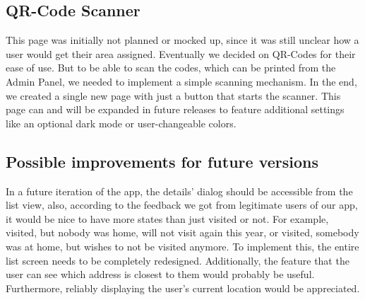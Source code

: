 \subsection{QR-Code Scanner}
This page was initially not planned or mocked up, since it was still unclear how a user would get their area assigned. Eventually we decided on QR-Codes for their ease of use. But to be able to scan the codes, which can be printed from the Admin Panel, we needed to implement a simple scanning mechanism. In the end, we created a single new page with just a button that starts the scanner. This page can and will be expanded in future releases to feature additional settings like an optional dark mode or user-changeable colors. 

\subsection{Possible improvements for future versions}

In a future iteration of the app, the details' dialog should be accessible from the list view, also, according to the feedback we got from legitimate users of our app, it would be nice to have more states than just visited or not. For example, visited, but nobody was home, will not visit again this year, or visited, somebody was at home, but wishes to not be visited anymore. To implement this, the entire list screen needs to be completely redesigned. Additionally, the feature that the user can see which address is closest to them would probably be useful. Furthermore, reliably displaying the user's current location would be appreciated.